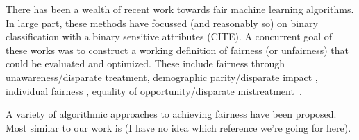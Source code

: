 There has been a wealth of recent work towards fair machine learning
algorithms. In large part, these methods have focussed (and reasonably
so) on binary classification with a binary sensitive attributes
(CITE). A concurrent goal of these works was to construct a working
definition of fairness (or unfairness) that could be evaluated and
optimized. These include fairness through unawareness/disparate
treatment\cite{grgiccase,zafar2016fairness}, demographic
parity/disparate impact \cite{zafar2015learning}, individual fairness
\cite{dwork2012fairness,zemel2013learning,louizos2015variational,joseph2016rawlsian},
equality of opportunity/disparate
mistreatment~\cite{hardt2016equality,zafar2016fairness}.

A variety of algorithmic approaches to achieving fairness have been proposed. Most similar to our work is \cite{zemel2013learning} (I have no idea which reference we're going for here).      







